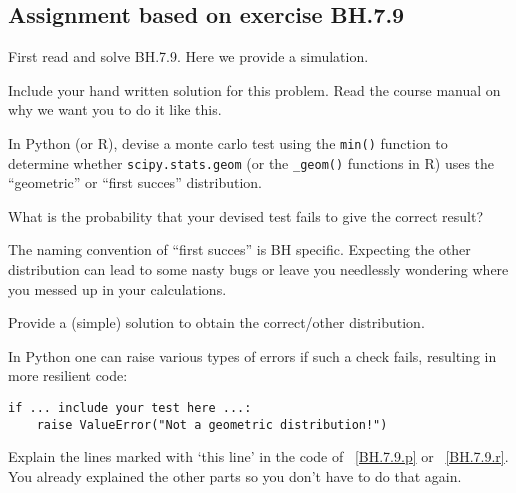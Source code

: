 \subsection{Assignment based on exercise BH.7.9}
\label{sec:bh.7.9}

First read and solve BH.7.9. Here we provide a simulation.

\begin{exercise}
Include your hand written solution for this problem. Read the course manual  on why we want you to do it like this.
\end{exercise}

\begin{exercise}
  In Python (or R), devise a monte carlo test using the \texttt{min()} function to determine whether \texttt{scipy.stats.geom} (or the \texttt{\_geom()} functions in R) uses the ``geometric'' or ``first succes'' distribution.

  What is the probability that your devised test fails to give the correct result?
\end{exercise}

\begin{exercise}
  The naming convention of ``first succes'' is BH specific.  Expecting
  the other distribution can lead to some nasty bugs or leave you
  needlessly wondering where you messed up in your calculations.

  Provide a (simple) solution to obtain the correct/other distribution.
\end{exercise}

In Python one can raise various types of errors if such a check fails, resulting in more resilient code:\

\begin{verbatim}
if ... include your test here ...:
    raise ValueError("Not a geometric distribution!")
\end{verbatim}

\begin{exercise}
Explain the lines marked with `this line' in the code of ~\cref{BH.7.9.p} or ~\cref{BH.7.9.r}. You already explained the other parts so you don't have to do that again.
\end{exercise}

